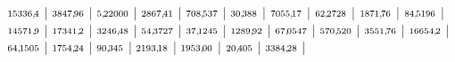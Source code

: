 \documentclass[12pt,fleqn]{article}
\theoremstyle{aufg}
\theoremstyle{bsp}
\begin{document}
\begin{flushleft}
$ \scriptstyle15336,\hspace{-1pt}4$ | $ \scriptstyle3847,\hspace{-1pt}96$ | $ \scriptstyle5,\hspace{-1pt}22000$ | $ \scriptstyle2867,\hspace{-1pt}41$ | $ \scriptstyle708,\hspace{-1pt}537$ | $ \scriptstyle30,\hspace{-1pt}388$ | $ \scriptstyle7055,\hspace{-1pt}17$ | $ \scriptstyle62,\hspace{-1pt}2728$ | $ \scriptstyle1871,\hspace{-1pt}76$ | $ \scriptstyle84,\hspace{-1pt}5196$ | $ \scriptstyle14571,\hspace{-1pt}9$ | $ \scriptstyle17341,\hspace{-1pt}2$ | $ \scriptstyle3246,\hspace{-1pt}48$ | $ \scriptstyle54,\hspace{-1pt}3727$ | $ \scriptstyle37,\hspace{-1pt}1245$ | $ \scriptstyle1289,\hspace{-1pt}92$ | $ \scriptstyle67,\hspace{-1pt}0547$ | $ \scriptstyle570,\hspace{-1pt}520$ | $ \scriptstyle3551,\hspace{-1pt}76$ | $ \scriptstyle16654,\hspace{-1pt}2$ | $ \scriptstyle64,\hspace{-1pt}1505$ | $ \scriptstyle1754,\hspace{-1pt}24$ | $ \scriptstyle90,\hspace{-1pt}345$ | $ \scriptstyle2193,\hspace{-1pt}18$ | $ \scriptstyle1953,\hspace{-1pt}00$ | $ \scriptstyle20,\hspace{-1pt}405$ | $ \scriptstyle3384,\hspace{-1pt}28$ | \end{flushleft} 
    
\end{document}
